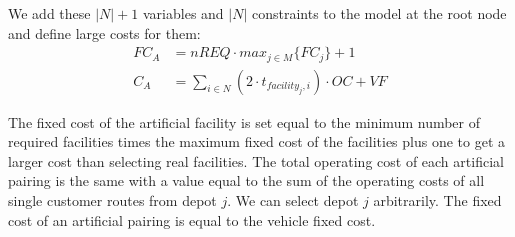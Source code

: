 We add these $|N|+1$ variables and $|N|$ constraints to the model at the root node and define large costs for them:
\begin{align*}
 FC_A & =nREQ \cdot max_{j \in M}\{FC_j\}+1 \nonumber \\
 C_A & = \sum_{i \in N}(2 \cdot t_{facility_j,i}) \cdot OC + VF  \nonumber
\end {align*} 

The fixed cost of the artificial facility is set equal to the minimum number of required facilities 
times the maximum fixed cost of the facilities plus one to get a larger cost than selecting
real facilities. The total operating cost of each artificial 
pairing is the same with  a value equal to the sum of the operating costs of all single 
customer routes from depot $j$. We can select depot $j$ arbitrarily. The fixed cost of an artificial pairing is equal to the vehicle fixed cost. 
 













